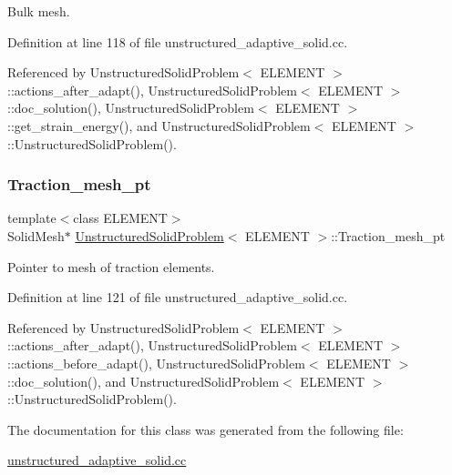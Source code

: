 Bulk mesh. 



Definition at line 118 of file unstructured\+\_\+adaptive\+\_\+solid.\+cc.



Referenced by Unstructured\+Solid\+Problem$<$ E\+L\+E\+M\+E\+N\+T $>$\+::actions\+\_\+after\+\_\+adapt(), Unstructured\+Solid\+Problem$<$ E\+L\+E\+M\+E\+N\+T $>$\+::doc\+\_\+solution(), Unstructured\+Solid\+Problem$<$ E\+L\+E\+M\+E\+N\+T $>$\+::get\+\_\+strain\+\_\+energy(), and Unstructured\+Solid\+Problem$<$ E\+L\+E\+M\+E\+N\+T $>$\+::\+Unstructured\+Solid\+Problem().

\mbox{\label{classUnstructuredSolidProblem_a42018e62ce6bf48968f389880669c8f4}} 
\subsubsection{\texorpdfstring{Traction\+\_\+mesh\+\_\+pt}{Traction\_mesh\_pt}}
{\footnotesize\ttfamily template$<$class E\+L\+E\+M\+E\+NT$>$ \\
Solid\+Mesh$\ast$ \hyperlink{classUnstructuredSolidProblem}{Unstructured\+Solid\+Problem}$<$ E\+L\+E\+M\+E\+NT $>$\+::Traction\+\_\+mesh\+\_\+pt\hspace{0.3cm}{\ttfamily [private]}}



Pointer to mesh of traction elements. 



Definition at line 121 of file unstructured\+\_\+adaptive\+\_\+solid.\+cc.



Referenced by Unstructured\+Solid\+Problem$<$ E\+L\+E\+M\+E\+N\+T $>$\+::actions\+\_\+after\+\_\+adapt(), Unstructured\+Solid\+Problem$<$ E\+L\+E\+M\+E\+N\+T $>$\+::actions\+\_\+before\+\_\+adapt(), Unstructured\+Solid\+Problem$<$ E\+L\+E\+M\+E\+N\+T $>$\+::doc\+\_\+solution(), and Unstructured\+Solid\+Problem$<$ E\+L\+E\+M\+E\+N\+T $>$\+::\+Unstructured\+Solid\+Problem().



The documentation for this class was generated from the following file\+:\begin{DoxyCompactItemize}
\item 
\hyperlink{unstructured__adaptive__solid_8cc}{unstructured\+\_\+adaptive\+\_\+solid.\+cc}\end{DoxyCompactItemize}

